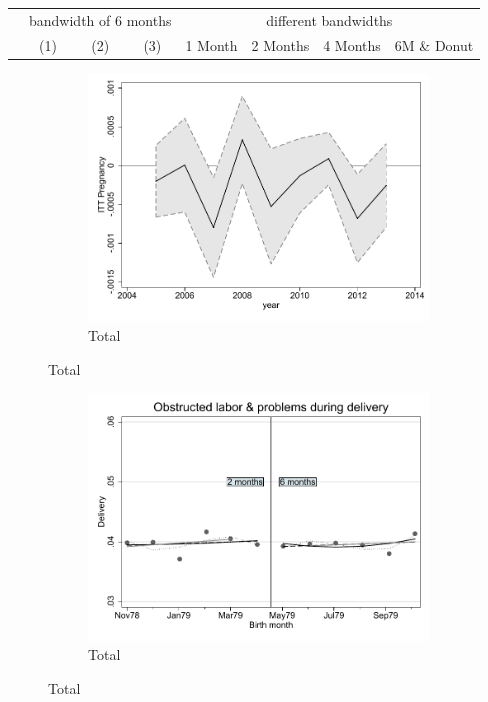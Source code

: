 \documentclass[a4paper ]{article}
\begin{document}
\begin{table}[h]\centering
\def\sym#1{\ifmmode^{#1}\else\(^{#1}\)\fi}
\begin{tabular}{l*{3}{c}|cccc}
\toprule
&\multicolumn{3}{c}{bandwidth of 6 months} & \multicolumn{4}{c}{different bandwidths} \\
 \cmidrule(lr{1em}){2-4} \cmidrule(lr{1em}){5-8}
 &\multicolumn{1}{c}{(1)}&\multicolumn{1}{c}{(2)}&\multicolumn{1}{c}{(3)}& 1 Month & 2 Months & 4 Months & 6M \& Donut \\
\midrule 

\bottomrule
\end{tabular}
\end{table}

\begin{figure}[h!]
	\centering
	\begin{subfigure}[t]{0.5\textwidth}
		\centering
		\includegraphics[width=0.99\textwidth]{R1_LC_Pregnancy}
		\caption{Total}		
	\end{subfigure}
\end{figure}
\newpage
\begin{figure}[h]
	\centering
	\begin{subfigure}[t]{0.5\textwidth}
		\centering
		\includegraphics[width=0.99\textwidth]{R1_RD_Delivery_fits}
		\caption{Total}		
	\end{subfigure}
\end{figure}
\end{document}
